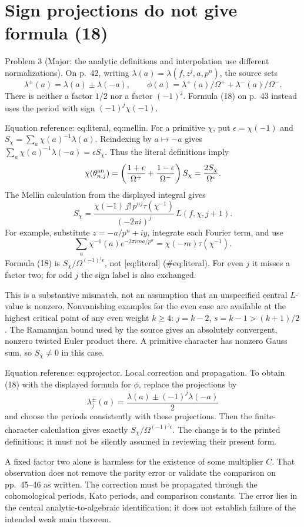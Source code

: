 \documentclass[10pt]{article}
\begin{document}
\section*{Sign projections do not give formula (18)}
Problem 3 (Major: the analytic definitions and interpolation use different normalizations).  On p. 42, writing \(\lambda(a)=\lambda(f,z^j,a,p^n)\), the source sets \[\lambda^\pm(a)=\lambda(a)\pm\lambda(-a),\qquad
 \phi(a)=\lambda^+(a)/\Omega^++\lambda^-(a)/\Omega^-.\] There is neither a factor \(1/2\) nor a factor \((-1)^j\). Formula (18) on p. 43 instead uses the period with sign \((-1)^j\chi(-1)\).\par
Equation reference: eq:literal, eq:mellin. For a primitive \(\chi\), put \(\epsilon=\chi(-1)\) and \(S_\chi=\sum_a\chi(a)^{-1}\lambda(a)\). Reindexing by \(a\mapsto-a\) gives \(\sum_a\chi(a)^{-1}\lambda(-a)=\epsilon S_\chi\). Thus the literal definitions imply \[\chi(\theta_{n,j}^{\rm an})
 =\left(\frac{1+\epsilon}{\Omega^+}
       +\frac{1-\epsilon}{\Omega^-}\right)S_\chi
 =\frac{2S_\chi}{\Omega^\epsilon}.
 \] The Mellin calculation from the displayed integral gives \[S_\chi=
 \frac{\chi(-1)\,j!\,p^{nj}\tau(\chi^{-1})}
      {(-2\pi i)^j}\,L(f,\chi,j+1).
 \] For example, substitute \(z=-a/p^n+iy\), integrate each Fourier term, and use \[\sum_a\chi^{-1}(a)e^{-2\pi i ma/p^n}
 =\chi(-m)\tau(\chi^{-1}).\] Formula (18) is \(S_\chi/\Omega^{(-1)^j\epsilon}\), not [eq:literal] (\#eq:literal). For even \(j\) it misses a factor two; for odd \(j\) the sign label is also exchanged.\par
This is a substantive mismatch, not an assumption that an unspecified central \(L\)-value is nonzero. Nonvanishing examples for the even case are available at the highest critical point of any even weight \(k\geq4\): \(j=k-2\), \(s=k-1>(k+1)/2\). The Ramanujan bound used by the source gives an absolutely convergent, nonzero twisted Euler product there. A primitive character has nonzero Gauss sum, so \(S_\chi\ne0\) in this case.\par
Equation reference: eq:projector. Local correction and propagation. To obtain (18) with the displayed formula for \(\phi\), replace the projections by \[\lambda^\pm_j(a)
 =\frac{\lambda(a)\pm(-1)^j\lambda(-a)}2
 \] and choose the periods consistently with these projections. Then the finite-character calculation gives exactly \(S_\chi/\Omega^{(-1)^j\epsilon}\). The change is to the printed definitions; it must not be silently assumed in reviewing their present form.\par
A fixed factor two alone is harmless for the existence of some multiplier \(C\). That observation does not remove the parity error or validate the comparison on pp. 45–46 as written. The correction must be propagated through the cohomological periods, Kato periods, and comparison constants. The error lies in the central analytic-to-algebraic identification; it does not establish failure of the intended weak main theorem.\par
\end{document}
